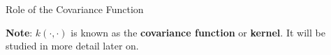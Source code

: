 \documentclass[11pt,compress,t,notes=noshow, xcolor=table]{beamer}
\begin{document}
\begin{vbframe}{Role of the Covariance Function}
\begin{itemize}
\end{itemize}

\begin{footnotesize}
\textbf{Note}: $k(\cdot,\cdot)$ is known as the \textbf{covariance function} or \textbf{kernel}. It will be studied in more detail later on.
\end{footnotesize}

\end{vbframe}

\endlecture
\end{document}

